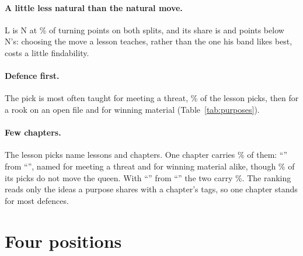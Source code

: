 \documentclass[11pt]{article}
\begin{document}
\paragraph{A little less natural than the natural move.} L is N at \TrainIsNatural\% of turning
points on both splits, and its share is \TrainVsNatural{} and \HeldVsNatural{} points below N's:
choosing the move a lesson teaches, rather than the one his band likes best, costs a little
findability.

\paragraph{Defence first.} The pick is most often taught for meeting a threat, \ThreatShare\% of
the lesson picks, then for a rook on an open file and for winning material
(Table~\ref{tab:purposes}).

\paragraph{Few chapters.} The \TaughtN{} lesson picks name \LessonsAll{} lessons and \ChaptersAll{}
chapters. One chapter carries \FirstShare\% of them: ``\FirstIdea'' from ``\FirstTitle'', named for
meeting a threat and for winning material alike, though \FirstNotQueen\% of its picks do not move
the queen. With ``\SecondIdea'' from ``\SecondTitle'' the two carry \TwoShare\%. The ranking reads
only the ideas a purpose shares with a chapter's tags, so one chapter stands for most defences.

\section{Four positions}
\end{document}
